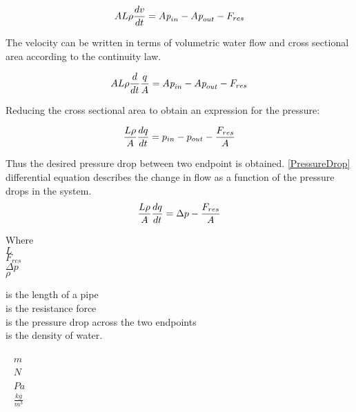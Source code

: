  \begin{equation}
    A L \rho \frac{dv}{dt} = A \textit{p}_{in} - A \textit{p}_{out} - F_{res} \\
\end{equation}

The velocity can be written in terms of volumetric water flow and cross sectional area according to the continuity law.

\begin{equation}
    A L \rho \frac{d}{dt} \frac{q}{A} = A \textit{p}_{in} - A \textit{p}_{out} - F_{res} \\
\end{equation}

Reducing the cross sectional area to obtain an expression for the pressure: 

\begin{equation}
    \frac{L \rho}{A} \frac{dq}{dt} =p_{in} - p_{out} - \frac{ F_{res}}{A} \\
\end{equation}

Thus the desired pressure drop between two endpoint is obtained. \eqref{PressureDrop} differential equation describes the change in flow as a function of the pressure drops in the system.
\begin{equation}
    \frac{L \rho}{A} \frac{dq}{dt} =\Delta p - \frac{ F_{res}}{A} \\
    \label{PressureDrop}
\end{equation}

 \begin{minipage}[t]{0.20\textwidth}
Where\\
\hspace*{8mm} $L$ \\
\hspace*{8mm} $F_{res}$ \\
\hspace*{8mm} $\Delta p$ \\
\hspace*{8mm} $\rho$ 
\end{minipage}
\begin{minipage}[t]{0.68\textwidth}
\vspace*{2mm}
is the length of a pipe\\
is the resistance force\\
is the pressure drop across the two endpoints\\
is the density of water.

\end{minipage}
\begin{minipage}[t]{0.10\textwidth}
\vspace*{2mm}
\textcolor{White}{te}$\unit{m}$\\
\textcolor{White}{te}$\unit{N}$\\
\textcolor{White}{te}$\unit{Pa}$\\
\textcolor{White}{te}$\unit{\frac{kg}{m^{3}}}$
\end{minipage}

